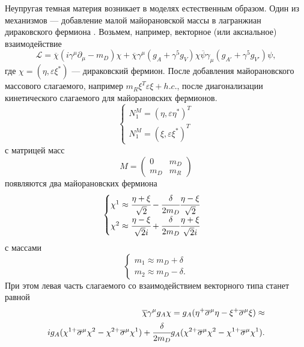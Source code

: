 Неупругая темная материя возникает в моделях естественным образом. 
Один из механизмов --- добавление малой майорановской массы в лагранжиан дираковского фермиона \cite{PhysRevD.64.043502}.
Возьмем, например, векторное (или аксиальное) взаимодействие 
\begin{equation}
	\label{eq:DM_L_naive_kinemat}
	\mathcal{L} = \overline{\chi}(i\gamma^{\mu}\partial_{\mu} - m_D)\chi +
	\overline{\chi}\gamma^{\mu}(g_A + \gamma^5 g_V) \chi \overline{\psi}\gamma_{\mu}(g_{A'} + \gamma^5 g_{V'})\psi ,
\end{equation}
где $\chi = (\eta,\varepsilon \xi^*)$ --- дираковский фермион. После добавления майорановского массового слагаемого, например $m_R\xi^T\varepsilon \xi + h.c.$, после диагонализации кинетического слагаемого для майорановских фермионов.
\begin{equation}
	\begin{cases}
		N_1^M = (\eta,\varepsilon\eta^*)^T\\
		N_1^M = (\xi,\varepsilon \xi^*)^T
	\end{cases}
\end{equation}
с матрицей масс
\begin{equation}
	M = 
	\begin{pmatrix}
		0 & m_D \\
		m_D & m_R
	\end{pmatrix}
\end{equation}
появляются два майорановских фермиона
\begin{equation}
	\begin{cases}
		\chi^1 \approx \cfrac{\eta + \xi}{\sqrt{2}} - \cfrac{\delta}{2m_D} \cfrac{\eta - \xi}{\sqrt{2} }\\
		\chi^2  \approx \cfrac{\eta - \xi}{\sqrt{2}i} + \cfrac{\delta}{2m_D} \cfrac{\eta + \xi}{\sqrt{2}i }\\
	\end{cases}
\end{equation}
с массами 
\begin{equation}
	\begin{cases}
		m_1 \approx m_D + \delta\\
		m_2 \approx m_D - \delta.		
	\end{cases}
\end{equation}
При этом левая часть слагаемого со взаимодействием векторного типа станет равной
\begin{equation}
	\begin{split}
	\overline{\chi}\gamma^{\mu}g_A \chi = 
	g_A(\eta^+ \overline{\sigma}^{\mu} \eta - \xi^+ \overline{\sigma}^{\mu} \xi) \approx \\ 
	i g_A (\chi^{1+} \overline{\sigma}^{\mu} \chi^2 - \chi^{2+} \overline{\sigma}^{\mu} \chi^1) + \cfrac{\delta}{2m_D}g_A 
	(
		\chi^{2+} \overline{\sigma}^{\mu}\chi^2 - 
		\chi^{1+}  \overline{\sigma}^{\mu}\chi^1
	).
	\end{split}
\end{equation}
